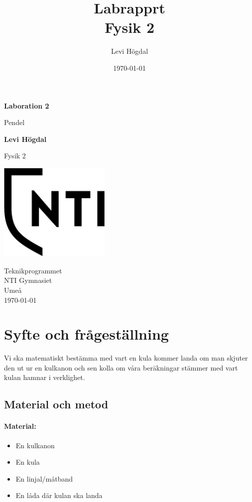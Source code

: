 \documentclass[11pt]{article}
\title{Labrapprt \\ \small Fysik 2}
\author{Levi Högdal }
\date{\today}
\begin{document}
    \begin{titlepage}
        \begin{center}
            \vspace*{1cm}

            \Huge
            \textbf{Laboration 2}

            \vspace{0.5cm}
            \LARGE
            Pendel

            \vspace{1.5cm}

            \textbf{Levi Högdal}

            \vfill


            Fysik 2

            \vspace{0.8cm}

            \includegraphics[width=0.4\textwidth]{../images/NTI Gymnasiet_Symbol_print_svart.png}

            \Large
            Teknikprogrammet\\
            NTI Gymnasiet\\
            Umeå\\
            \today

        \end{center}
    \end{titlepage}
    \section{Syfte och frågeställning}
    Vi ska matematiskt bestämma med vart en kula kommer landa om man skjuter den ut ur en kulkanon och sen kolla om våra beräkningar stämmer med vart kulan hamnar i verklighet.
    \subsection{Material och metod}
    \paragraph{Material:}
    \begin{itemize}
        \item En kulkanon
        \item En kula
        \item En linjal/måtband
        \item En låda där kulan ska landa
    \end{itemize}
\end{document}
